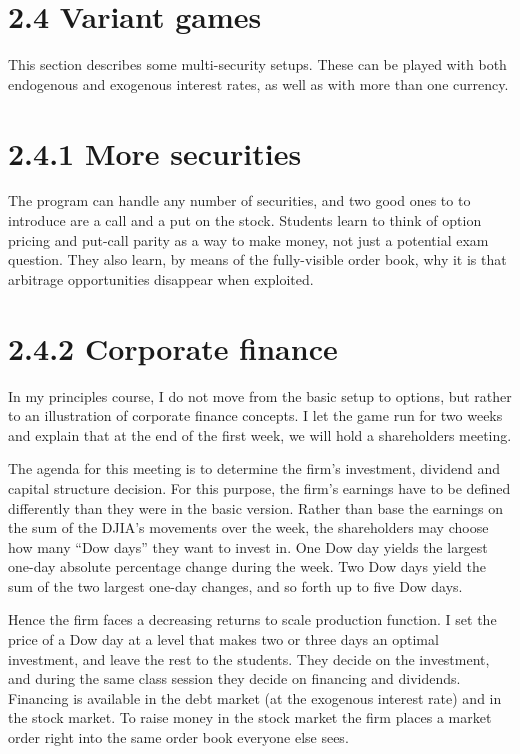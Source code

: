 \section{2.4 Variant games}%
This section describes some multi-security setups.  These can be played 
with both endogenous and exogenous interest rates, as well as with 
more than one currency. 
 
\section{2.4.1 More securities}%
The program can handle any number of securities, and two good ones to 
to introduce are a call and a put on the stock.%
Students learn to think of option pricing and 
put-call parity as a way to make money, not just a potential exam 
question.  They also learn, by means of the fully-visible order book, 
why it is that arbitrage opportunities disappear when exploited. 
 
\section{2.4.2 Corporate finance}%
In my principles course, I do not move from the basic setup to options, 
but rather to an illustration of corporate finance concepts.  I let the 
game run for two weeks and explain that at the end of the first week, 
we will hold a shareholders meeting. 
 
The agenda for this meeting is to determine the firm's investment, 
dividend and capital structure decision.  For this purpose, the firm's 
earnings have to be defined differently than they were in the basic 
version.  Rather than base the earnings on the sum of the DJIA's 
movements over the week, the shareholders may choose how many ``Dow 
days'' they want to invest in.  One Dow day yields the largest 
one-day absolute percentage change during the week.  Two Dow days 
yield the sum of the two largest one-day changes, and so forth up to 
five Dow days. 
 
Hence the firm faces a decreasing returns to scale production 
function.  I set the price of a Dow day at a level that makes two or 
three days an optimal investment, and leave the rest to the students. 
They decide on the investment, and during the same class session they 
decide on financing and dividends.  Financing is available in the 
debt market (at the exogenous interest rate) and in the stock market. 
To raise money in the stock market the firm places a market order 
right into the same order book everyone else sees. 
 
